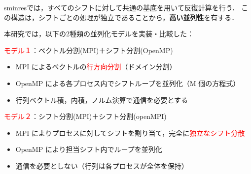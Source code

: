 

sminresでは，すべてのシフトに対して共通の基底を用いて反復計算を行う．  
この構造は，シフトごとの処理が独立であることから，\textbf{高い並列性}を有する．

本研究では，以下の2種類の並列化モデルを実装・比較した：

\vspace{10pt}
\textcolor{red}{モデル１}：ベクトル分割(MPI)＋シフト分割(OpenMP)
\begin{itemize} \setlength{\itemsep}{0pt}
	\item MPI によるベクトルの\textcolor{red}{行方向分割}（ドメイン分割）
	\item OpenMP による各プロセス内でシフトループを並列化（M 個の方程式）
	\item 行列ベクトル積，内積，ノルム演算で通信を必要とする
\end{itemize}
\vspace{0.5em}
\textcolor{red}{モデル２}：シフト分割(MPI)＋シフト分割(openMPI)
\begin{itemize} \setlength{\itemsep}{0pt}
	\item MPI によりプロセスに対してシフトを割り当て，完全に\textcolor{red}{独立なシフト分散}
	\item OpenMP により担当シフト内でループを並列化
	\item 通信を必要としない（行列は各プロセスが全体を保持）
\end{itemize}

